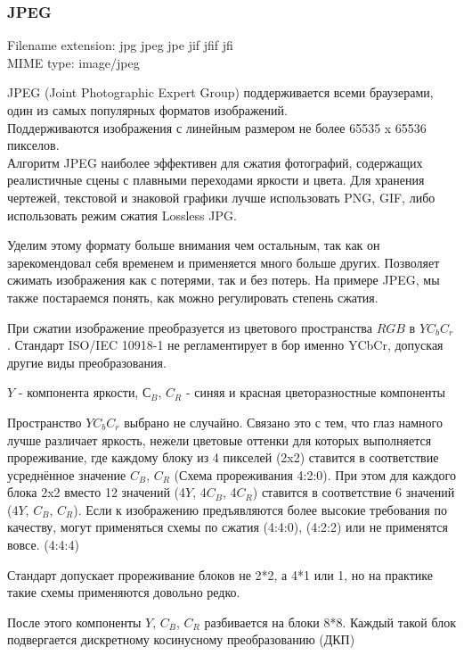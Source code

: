 \documentclass[12pt]{article}
\begin{document}
\subsubsection{JPEG}

Filename extension: jpg jpeg jpe jif jfif jfi \\
MIME type: image/jpeg

JPEG (Joint Photographic Expert Group) поддерживается всеми браузерами,
один из самых популярных форматов изображений. \\
Поддерживаются изображения с линейным размером не более 65535 x 65536 пикселов. \\

Алгоритм JPEG наиболее эффективен для сжатия фотографий, содержащих реалистичные сцены
с плавными переходами яркости и цвета. Для хранения чертежей, текстовой и знаковой
графики лучше использовать PNG, GIF,
либо использовать режим сжатия Lossless JPG.

Уделим этому формату больше внимания чем остальным, так как он зарекомендовал себя временем
и применяется много больше других. Позволяет сжимать изображения как с потерями,
так и без потерь.
На примере JPEG, мы также постараемся понять, как можно регулировать степень сжатия.

При сжатии изображение преобразуется из цветового пространства $RGB$ в $YC_{b}C_{r}$.
Стандарт ISO/IEC 10918-1 не регламентирует в    бор именно YCbCr,
допуская другие виды преобразования.

$Y$ - компонента яркости, $С_{B}$, $C_{R}$ - синяя и красная цветоразностные компоненты

Пространство $YC_{b}C_{r}$  выбрано не случайно. Связано это с тем, что глаз намного лучше различает
яркость, нежели цветовые оттенки для которых выполняется прореживание, где каждому блоку
из 4 пикселей (2x2) ставится в соответствие усреднённое значение $C_{B}$, $C_{R}$ (Схема прореживания 4:2:0).
При этом для каждого блока 2x2 вместо 12 значений (4$Y$, 4$C_{B}$, 4$C_{R}$)
ставится в соответствие 6 значений (4$Y$, $C_{B}$, $C_{R}$). Если к изображению предъявляются более высокие
требования по качеству, могут применяться схемы по сжатия (4:4:0), (4:2:2)
или не применятся вовсе. (4:4:4)

Стандарт допускает прореживание блоков не 2*2, а 4*1 или 1,
но на практике такие схемы применяются довольно редко.

После этого компоненты $Y$, $C_{B}$, $C_{R}$ разбивается на блоки 8*8.
Каждый такой блок подвергается дискретному косинусному преобразованию (ДКП)
\end{document}
